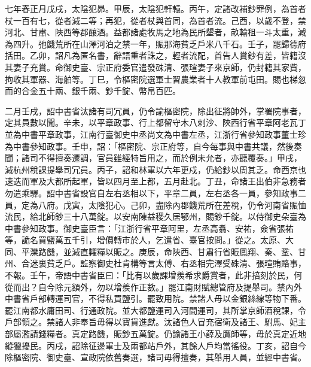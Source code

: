 
\begin{pinyinscope}

 七年春正月戊戌，太陰犯昴。甲辰，太陰犯軒轅。丙午，定諸改補鈔罪例，為首者杖一百有七，從者減二等；再犯，從者杖與首同，為首者流。己酉，以歲不登，禁河北、甘肅、陜西等郡釀酒。益都諸處牧馬之地為民所墾者，畝輸租一斗太重，減為四升。弛饑荒所在山澤河泊之禁一年，賑那海貧乏戶米八千石。壬子，罷歸德府括田。乙卯，詔凡為匿名書，辭語重者誅之，輕者流配，首告人賞鈔有差，皆籍沒其妻子充賞。命御史臺、宗正府委官遣發硃清、張瑄妻子來京師，仍封籍其家貲，拘收其軍器、海舶等。丁巳，令樞密院選軍士習農業者十人教軍前屯田。賜也梯忽而的合金五十兩、銀千兩、鈔千錠、幣帛百匹。



 二月壬戌，詔中書省汰諸有司冗員，仍令諭樞密院，除出征將帥外，掌署院事者，定其員數以聞。辛未，以平章政事、行上都留守木八剌沙、陜西行省平章阿老瓦丁並為中書平章政事，江南行臺御史中丞尚文為中書左丞，江浙行省參知政事董士珍為中書參知政事。壬申，詔：「樞密院、宗正府等，自今每事與中書共議，然後奏聞；諸司不得擅奏遷調，官員雖經特旨用之，而於例未允者，亦聽覆奏。」甲戌，減杭州稅課提舉司冗員。丙子，詔和林軍以六年更戍，仍給鈔以周其乏。命西京也速迭而軍及大都所起軍，皆以四月至上都，五月赴北。丁丑，命諸王出伯非急務者勿遣乘驛。詔中書省設官自左右丞相以下，平章二員，左右丞各一員，參知政事二員，定為八府。戊寅，太陰犯心。己卯，盡除內郡饑荒所在差稅，仍令河南省賑恤流民，給北師鈔三十八萬錠。以安南陳益稷久居鄂州，賜鈔千錠。以侍御史朵臺為中書參知政事。御史臺臣言：「江浙行省平章阿里，左丞高翥、安祐，僉省張祐等，詭名買鹽萬五千引，增價轉市於人，乞遣省、臺官按問。」從之。太原、大同、平灤路饑，並減直糶糧以賑之。庚辰，命陜西、甘肅行省賑鳳翔、秦、鞏、甘州、合迷裏貧乏戶。監察御史杜肯構等言太傅、右丞相完澤受硃清、張瑄賄賂事，不報。壬午，帝語中書省臣曰：「比有以歲課增羨希求爵賞者，此非掊刻於民，何從而出？自今除元額外，勿以增羨作正數。」罷江南財賦總管府及提舉司。禁內外中書省戶部轉運司官，不得私買鹽引。罷致用院。禁諸人毋以金銀絲線等物下番。罷江南都水庸田司、行通政院。並大都鹽運司入河間運司，其所掌京師酒稅課，令戶部領之。禁諸人非奉旨毋得以寶貨進獻。汰諸色人冒充宿衛及諸王、駙馬、妃主部屬濫請錢糧者。真定路饑，賑鈔五萬錠。仍諭諸王小薛及鷹師等，毋於真定近地縱獵擾民。丙戌，詔除征邊軍士及兩都站戶外，其餘人戶均當徭役。丁亥，詔自今除樞密院、御史臺、宣政院依舊奏選，諸司毋得擅奏，其舉用人員，並經中書省。




\end{pinyinscope}
